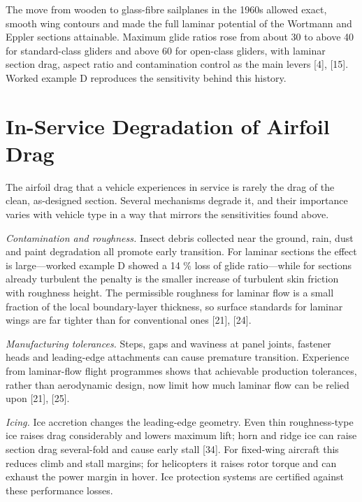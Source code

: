\documentclass[10pt,a4paper,twocolumn]{article}
\begin{document}
The move from wooden to glass-fibre sailplanes in the 1960s allowed
exact, smooth wing contours and made the full laminar potential of the
Wortmann and Eppler sections attainable. Maximum glide ratios rose from
about 30 to above 40 for standard-class gliders and above 60 for
open-class gliders, with laminar section drag, aspect ratio and
contamination control as the main levers {[}4{]}, {[}15{]}. Worked
example D reproduces the sensitivity behind this history.

\hypertarget{in-service-degradation-of-airfoil-drag}{%
\section{In-Service Degradation of Airfoil
Drag}\label{in-service-degradation-of-airfoil-drag}}

The airfoil drag that a vehicle experiences in service is rarely the
drag of the clean, as-designed section. Several mechanisms degrade it,
and their importance varies with vehicle type in a way that mirrors the
sensitivities found above.

\emph{Contamination and roughness.} Insect debris collected near the
ground, rain, dust and paint degradation all promote early transition.
For laminar sections the effect is large---worked example D showed a 14
\% loss of glide ratio---while for sections already turbulent the
penalty is the smaller increase of turbulent skin friction with
roughness height. The permissible roughness for laminar flow is a small
fraction of the local boundary-layer thickness, so surface standards for
laminar wings are far tighter than for conventional ones {[}21{]},
{[}24{]}.

\emph{Manufacturing tolerances.} Steps, gaps and waviness at panel
joints, fastener heads and leading-edge attachments can cause premature
transition. Experience from laminar-flow flight programmes shows that
achievable production tolerances, rather than aerodynamic design, now
limit how much laminar flow can be relied upon {[}21{]}, {[}25{]}.

\emph{Icing.} Ice accretion changes the leading-edge geometry. Even thin
roughness-type ice raises drag considerably and lowers maximum lift;
horn and ridge ice can raise section drag several-fold and cause early
stall {[}34{]}. For fixed-wing aircraft this reduces climb and stall
margins; for helicopters it raises rotor torque and can exhaust the
power margin in hover. Ice protection systems are certified against
these performance losses.
\end{document}
